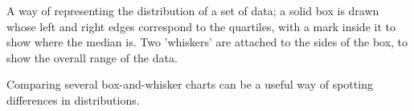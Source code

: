 A way of representing the distribution of a set of data;
a solid box is drawn whose left and right edges correspond to
the quartiles, with a mark inside it to show where the median is.
Two 'whiskers' are attached to the sides of the box, to show the
overall range of the data.
\par
Comparing several box-and-whisker charts can be a useful way of
spotting differences in distributions.
